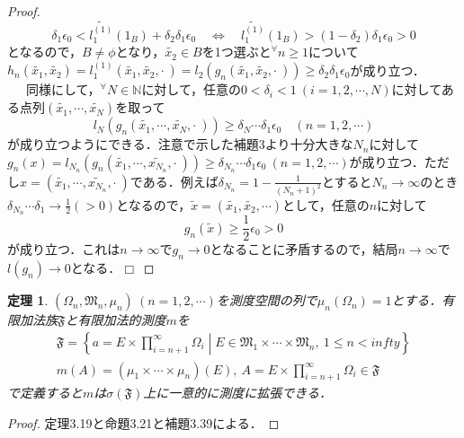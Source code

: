 \documentclass[a4paper,11pt]{jsarticle}
\newtheorem{theorem}[definition]{定理}
\newtheorem{proof}{証明}
\def\qed{\hfill $\Box$}
\begin{document}
\begin{proof}
\begin{equation*}
\delta_1\epsilon_0< \widetilde{l^{(1)}_1}(1_B)+\delta_2\delta_1\epsilon_0 \quad\Longleftrightarrow\quad \widetilde{l^{(1)}_1}(1_B)>(1-\delta_2)\delta_1\epsilon_0>0
\end{equation*}
となるので，$B\neq \phi$となり，$\widetilde{x_2}\in B$を1つ選ぶと$^\forall n\geq 1$について$h_n(\widetilde{x_1},\widetilde{x_2})=l^{(1)}_1(\widetilde{x_1},\widetilde{x_2},\cdot{\ })=l_2(g_n(\widetilde{x_1},\widetilde{x_2},\cdot{\ }))\geq\delta_2\delta_1\epsilon_0$が成り立つ．\\
{\ }{\ }{\ }同様にして，$^\forall N\in \mathbb{N}$に対して，任意の$0<\delta_i<1{\ }(i=1,2,\cdots,N)$に対してある点列$(\widetilde{x_1},\cdots,\widetilde{x_N})$を取って
\begin{equation*}
l_N(g_n(\widetilde{x_1},\cdots,\widetilde{x_N},\cdot{\ }))\geq \delta_N\cdots\delta_1\epsilon_0 \quad (n=1,2,\cdots)
\end{equation*}
が成り立つようにできる．注意で示した補題3より十分大きな$N_n$に対して$g_n(x)=l_{N_n}(g_n(\widetilde{x_1},\cdots,\widetilde{x_{N_n}},\cdot{\ }))\geq \delta_{N_n}\cdots\delta_1\epsilon_0{\ }(n=1,2,\cdots)$が成り立つ．ただし$x=(\widetilde{x_1},\cdots,\widetilde{x_{N_n}},\cdot{\ })$である．例えば$\displaystyle \delta_{N_n}=1-\frac{1}{(N_n+1)^2}$とすると$N_n\to\infty$のとき$\displaystyle \delta_{N_n}\cdots\delta_1\to \frac{1}{2}(>0)$となるので，$\widetilde{x}=(\widetilde{x_1},\widetilde{x_2},\cdots)$として，任意の$n$に対して
\begin{equation*}
g_n(\widetilde{x})\geq \frac{1}{2}\epsilon_0>0
\end{equation*}
が成り立つ．これは$n\to\infty$で$g_n\to 0$となることに矛盾するので，結局$n\to\infty$で$l(g_n)\to 0$となる．\qed
\end{proof}
%
%
%
\begin{theorem}
$(\Omega_n,\mathfrak{M}_n,\mu_n){\ }(n=1,2,\cdots)$を測度空間の列で$\mu_n(\Omega_n)=1$とする．有限加法族$\mathfrak{F}$と有限加法的測度$m$を
\begin{eqnarray*}
\mathfrak{F}=\left\{a=E\times\prod_{i=n+1}^\infty\Omega_i \middle| E\in\mathfrak{M}_1\times\cdots\times\mathfrak{M}_n,{\ }1\leq n<infty \right\} \\
m(A)=(\mu_1\times\cdots\times\mu_n)(E),{\ }A=E\times\prod_{i=n+1}^\infty\Omega_i\in\mathfrak{F}
\end{eqnarray*}
で定義すると$m$は$\sigma(\mathfrak{F})$上に一意的に測度に拡張できる．
\end{theorem}
\begin{proof}
定理3.19と命題3.21と補題3.39による．
\end{proof}
\end{document}
